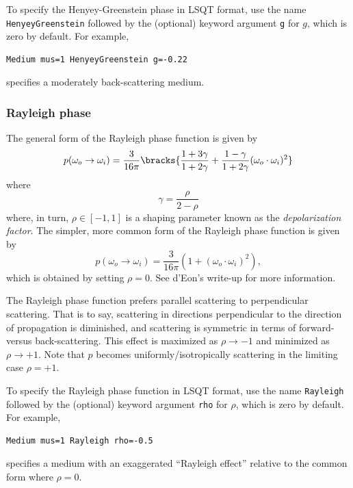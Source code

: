 \documentclass[
    twoside,
    twocolumn,
    letterpaper,
    10pt]{article}
\newcommand\namett[2]{{\color{code#1}\texttt{#2}}}
\begin{document}
To specify the Henyey-Greenstein phase in LSQT format, use the name
\namett{purple}{HenyeyGreenstein} followed by the (optional) keyword 
argument \texttt{g} for $g$, which is zero by default. For example,
\begin{lstlisting}
Medium mus=1 HenyeyGreenstein g=-0.22
\end{lstlisting}
specifies a moderately back-scattering medium.

\subsubsection{Rayleigh phase}
\label{sec:doc-media-rayleigh}

The general form of the Rayleigh phase function is given by
\begin{equation*}
    p(\omega_o\to\omega_i) = 
    \frac{3}{16\pi}
    \bracks{
        \frac{1 + 3\gamma}{1 + 2\gamma} +
        \frac{1 -  \gamma}{1 + 2\gamma} (\omega_o\cdot\omega_i)^2}
\end{equation*}
where
\begin{equation*}
    \gamma = \frac{\rho}{2 - \rho}
\end{equation*}
where, in turn, $\rho \in [-1, 1]$ is a shaping parameter known as 
the \emph{depolarization factor}. The simpler, more common form of the
Rayleigh phase function is given by
\begin{equation*}
    p(\omega_o\to\omega_i) = \frac{3}{16\pi}(1 + (\omega_o\cdot\omega_i)^2),
\end{equation*}
which is obtained by setting $\rho = 0$. See d'Eon's write-up
\cite[p.~19]{dEon:16} for more information.

The Rayleigh phase function prefers parallel scattering
to perpendicular scattering. That is to say, scattering in directions 
perpendicular to the direction of propagation is diminished, and scattering 
is symmetric in terms of forward- versus back-scattering. This effect is 
maximized as $\rho \to -1$ and minimized as $\rho \to +1$. Note that $p$ 
becomes uniformly/isotropically scattering in the limiting case $\rho = +1$.

To specify the Rayleigh phase function in LSQT format, use the name 
\namett{purple}{Rayleigh} followed by the (optional) keyword argument
\texttt{rho} for $\rho$, which is zero by default. For example,
\begin{lstlisting}
Medium mus=1 Rayleigh rho=-0.5
\end{lstlisting}
specifies a medium with an exaggerated ``Rayleigh effect'' relative to the
common form where $\rho=0$.
\end{document}
